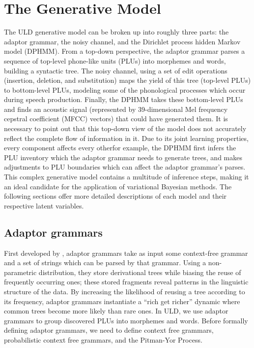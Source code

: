 \documentclass[12pt,letterpaper]{article}
\begin{document}
\section{The Generative Model}
The ULD generative model can be broken up into roughly three parts: the adaptor grammar, the noisy channel, and the Dirichlet process hidden Markov model (DPHMM). From a top-down perspective, the adaptor grammar parses a sequence of top-level phone-like units (PLUs) into morphemes and words, building a syntactic tree. The noisy channel, using a set of edit operations (insertion, deletion, and substitution) maps the yield of this tree (top-level PLUs) to bottom-level PLUs, modeling some of the phonological processes which occur during speech production. Finally, the DPHMM takes these bottom-level PLUs and finds an acoustic signal (represented by 39-dimensional Mel frequency cepstral coefficient (MFCC) vectors) that could have generated them. It is necessary to point out that this top-down view of the model does not accurately reflect the complete flow of information in it. Due to its joint learning properties, every component affects every other\textemdash for example, the DPHMM first infers the PLU inventory which the adaptor grammar needs to generate trees, and makes adjustments to PLU boundaries which can affect the adaptor grammar's parses. This complex generative model contains a multitude of inference steps, making it an ideal candidate for the application of variational Bayesian methods. The following sections offer more detailed descriptions of each model and their respective latent variables. 

\subsection{Adaptor grammars}
First developed by \citet{johnson:2007}, adaptor grammars take as input some context-free grammar and a set of strings which can be parsed by that grammar. Using a non-parametric distribution, they store derivational trees while biasing the reuse of frequently occurring ones; these stored fragments reveal patterns in the linguistic structure of the data. By increasing the likelihood of reusing a tree according to its frequency, adaptor grammars instantiate a ``rich get richer'' dynamic where common trees become more likely than rare ones. In ULD, we use adaptor grammars to group discovered PLUs into morphemes and words. Before formally defining adaptor grammars, we need to define context free grammars, probabilistic context free grammars, and the Pitman-Yor Process.
\end{document}
